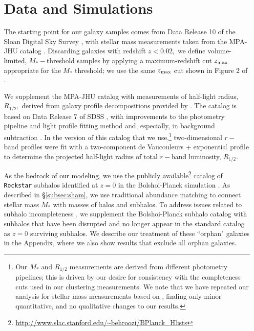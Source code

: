 \documentclass[usenatbib,usegraphicx,letterpaper]{mn2e}
\newcommand{\rhalf}{R_{1/2}}
\newcommand{\mstar}{M_{\ast}}
\begin{document}
\section{Data and Simulations}
\label{sec:data}

The starting point for our galaxy samples comes from Data Release 10 of the Sloan Digital Sky Survey \citep[SDSS,][]{ahn_etal14}, with stellar mass measurements taken from the MPA-JHU catalog \citep{kauffmann_etal03,brinchmann_etal04}. Discarding galaxies with redshift $z<0.02,$ we define volume-limited, $\mstar-$threshold samples by applying a maximum-redshift cut $z_{\rm max}$ appropriate for the $\mstar$ threshold; we use the same $z_{\rm max}$ cut shown in Figure 2 of \citet{behroozi_etal15}.

We supplement the MPA-JHU catalog with measurements of half-light radius, $\rhalf,$ derived from galaxy profile decompositions provided by \citet{meert_etal15}. The \citet{meert_etal15} catalog is based on Data Release 7 of SDSS \citep{abazajian_etal09}, with improvements to the photometry pipeline and light profile fitting method and, especially, in background subtraction \citep{vikram_etal10,bernardi_etal13,bernardi_etal14,meert_etal13}. In the version of this catalog that we use,\footnote{Our $\mstar$ and $\rhalf$ measurements are derived from different photometry pipelines; this is driven by our desire for consistency with the \citet{behroozi_etal15} completeness cuts used in our clustering measurements. We note that we have repeated our analysis for stellar mass measurements based on \citet{meert_etal15}, finding only minor quantitative, and no qualitative changes to our results.} two-dimensional $r-$band profiles were fit with a two-component de Vaucouleurs + exponential profile to determine the projected half-light radius of total $r-$band luminosity, $\rhalf.$

As the bedrock of our modeling, we use the publicly available\footnote{\url{http://www.slac.stanford.edu/~behroozi/BPlanck\_Hlists}} catalog of {\tt Rockstar} subhalos identified at $z=0$ in the Bolshoi-Planck simulation \citep{klypin_etal11,klypin_etal16,behroozi12_rockstar,riebe_etal13,behroozi_etal12b,rodriguez_puebla16_bolplanck}. As described in \S\ref{subsec:sham}, we use traditional abundance matching to connect stellar mass $\mstar$ with masses of halos and subhalos. To address issues related to subhalo incompleteness \citep{guo_white13,campbell_etal17}, we supplement the Bolshoi-Planck subhalo catalog with subhalos that have been disrupted and no longer appear in the standard catalog as $z=0$ surviving subhalos. We describe our treatment of these ``orphan" galaxies in the Appendix, where we also show results that exclude all orphan galaxies. 
\end{document}
